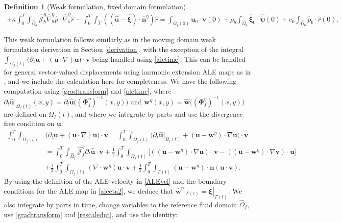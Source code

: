 \documentclass[11pt]{article}
\newcommand{\bd}{\boldsymbol}
\theoremstyle{definition}
\newtheorem{definition}{Definition}[section]
\begin{document}
\begin{definition}[Weak formulation, fixed domain formulation]
\begin{multline*}
+ \kappa \int_{0}^{T} \int_{\hat{\Omega}_{b}} \hat{\mathcal{J}}^{\eta}_{b} \hat{\nabla}^{\eta}_{b} \hat{p} \cdot \hat{\nabla}^{\eta}_{b} \hat{r} - \int_{0}^{T} \int_{\hat{\Gamma}} ((\hat{\bd{u}} - \hat{\bd{\xi}}) \cdot \hat{\bd{n}}^{\eta}) \hat{r} = \int_{\Omega_{f}(0)} \bd{u}_0 \cdot \bd{v}(0) + \rho_{b} \int_{\hat{\Omega}_{b}} \hat{\bd{\xi}}_{0} \cdot \hat{\bd{\psi}}(0) + c_{0} \int_{\hat{\Omega}_{b}} \hat{p}_0 \cdot \hat{r}(0).
\end{multline*}
\end{definition}

This weak formulation follows similarly as in the moving domain weak formulation derivation in Section \ref{derivation}, with the exception of the integral $\displaystyle \int_{\Omega_{f}(t)} \Big(\partial_{t}\bd{u} + (\bd{u} \cdot \nabla) \bd{u}\Big) \cdot \bd{v}$ being handled using \eqref{aletime}. This can be handled for general vector-valued displacements using harmonic extension ALE maps as in \cite{BorSunSlip}, and we include the calculation here for completeness. We have the following computation using \eqref{gradtransform} and \eqref{aletime}, where $\partial_{t}\hat{\bd{u}}|_{\Omega_{f}(t)}(x, y) = \partial_{t}\hat{\bd{u}}\Big((\bd{\Phi}^{\eta}_{f})^{-1}(x, y)\Big)$ and $\bd{w}^{\eta}(x, y) = \hat{\bd{w}}\Big((\bd{\Phi}^{\eta}_{f})^{-1}(x, y)\Big)$ are defined on $\Omega_{f}(t)$, and where we integrate by parts and use the divergence free condition on $\bd{u}$:
\begin{align*}
\int_{0}^{T} \int_{\Omega_{f}(t)} &\Big(\partial_{t}\bd{u} + (\bd{u} \cdot \nabla) \bd{u}\Big) \cdot \bd{v} = \int_{0}^{T} \int_{\Omega_{f}(t)} \Big(\partial_{t}\hat{\bd{u}}|_{\Omega_{f}(t)} + (\bd{u} - \bd{w}^{\eta}) \cdot \nabla \bd{u}\Big) \cdot \bd{v} \\
& = \int_{0}^{T} \int_{\hat{\Omega}_{f}} \hat{\mathcal{J}}^{\eta}_{f} \partial_{t}\hat{\bd{u}} \cdot \bd{v} + \frac{1}{2} \int_{0}^{T} \int_{\Omega_{f}(t)} \Big[((\bd{u} - \bd{w}^{\eta}) \cdot \nabla \bd{u}) \cdot \bd{v} - ((\bd{u} - \bd{w}^{\eta}) \cdot \nabla \bd{v}) \cdot \bd{u}\Big] \\
&+ \frac{1}{2} \int_{0}^{T} \int_{\Omega_{f}(t)} (\nabla \cdot \bd{w}^{\eta}) \bd{u} \cdot \bd{v} + \frac{1}{2} \int_{0}^{T} \int_{\Gamma(t)} (\bd{u} - \bd{w}^{\eta}) \cdot \bd{n} (\bd{u} \cdot \bd{v}).
\end{align*}
By using the definition of the ALE velocity in \eqref{ALEvel} and the boundary conditions for the ALE map in \eqref{aleeta2}, we deduce that $\hat{\bd{w}}^{\eta}|_{\Gamma(t)} = \bd{\xi}|_{\Gamma(t)}$. We also integrate by parts in time, change variables to the reference fluid domain $\hat{\Omega}_{f}$, use \eqref{gradtransform} and \eqref{rescalednt}, and use the identity:
\end{document}
